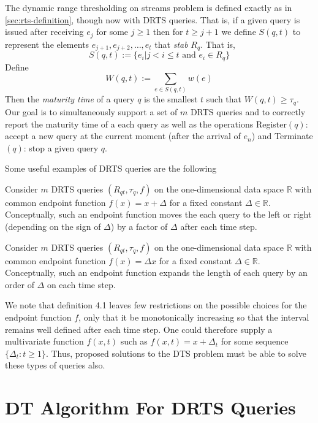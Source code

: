 The dynamic range thresholding on streams problem is defined exactly as in \cref{sec:rts-definition}, though now with DRTS queries. That is, if a given query is issued after receiving $e_j$ for some $j\geq 1$ then for $t\geq j+1$ we define $S(q,t)$ to represent the elements $e_{j+1},e_{j+2},\dots,e_t$ that \textit{stab} $R_q$. That is, 
$$S(q, t) := \{e_i | j < i \leq t \text{ and } e_i \in R_q\}$$
Define
$$W(q, t) := \sum_{e\in S(q,t)}w(e)$$
Then the \textit{maturity time} of a query $q$ is the smallest $t$ such that $W(q,t)\geq \tau_q$. Our goal is to simultaneously support a set of $m$ DRTS queries and to correctly report the maturity time of a each query as well as the operations Register$(q)$: accept a new query at the current moment (after the arrival of $e_n$) and Terminate$(q)$: stop a given query $q$.

Some useful examples of DRTS queries are the following

\begin{example} Consider $m$ DRTS queries $(R_{qt}, \tau_q, f)$ on the one-dimensional data space  $\mathbb{R}$ with common endpoint function $f(x) = x + \Delta$ for a fixed constant $\Delta\in\mathbb{R}$. Conceptually, such an endpoint function moves the each query to the left or right (depending on the sign of $\Delta$) by a factor of $\Delta$ after each time step.
\end{example}

\begin{example} Consider $m$ DRTS queries $(R_{qt}, \tau_q, f)$ on the one-dimensional data space  $\mathbb{R}$ with common endpoint function $f(x) = \Delta x$  for a fixed constant $\Delta\in\mathbb{R}$. Conceptually, such an endpoint function expands the length of each query by an order of $\Delta$ on each time step.
\end{example}
    
We note that definition 4.1 leaves few restrictions on the possible choices for the endpoint function $f$, only that it be monotonically increasing so that the interval remains well defined after each time step. One could therefore supply a multivariate function $f(x,t)$ such as $f(x, t) = x + \Delta_t$ for some sequence $\{\Delta_t: t\geq1\}$. Thus, proposed solutions to the DTS problem must be able to solve these types of queries also. 

\section{DT Algorithm For DRTS Queries}
\label{sec:drts-dt-algorithm}

